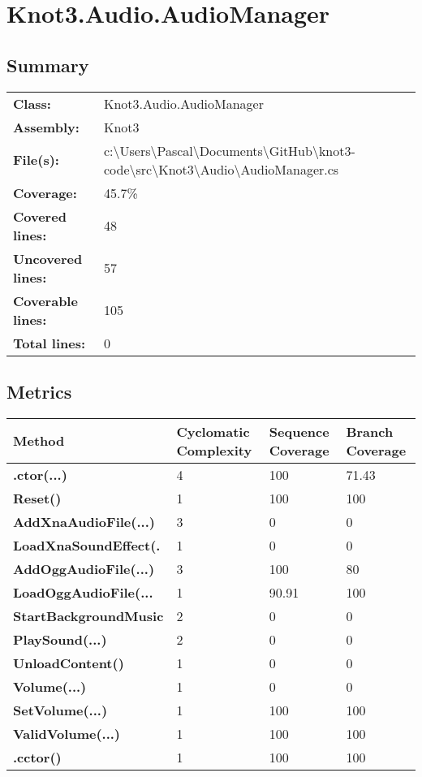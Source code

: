 \documentclass[a4paper,10pt]{article}
\begin{document}
\section{Knot3.Audio.AudioManager}
\subsection{Summary}
\begin{longtable}[l]{ll}
\textbf{Class:} & Knot3.Audio.AudioManager\\
\textbf{Assembly:} & Knot3\\
\textbf{File(s):} & \begin{minipage}[t]{12cm}{c:\textbackslash Users\textbackslash Pascal\textbackslash Documents\textbackslash GitHub\textbackslash knot3-code\textbackslash src\textbackslash Knot3\textbackslash Audio\textbackslash AudioManager.cs}\end{minipage} \\
\textbf{Coverage:} & 45.7\%\\
\textbf{Covered lines:} & 48\\
\textbf{Uncovered lines:} & 57\\
\textbf{Coverable lines:} & 105\\
\textbf{Total lines:} & 0\\
\end{longtable}
\subsection{Metrics}
\begin{longtable}[l]{|l|l|l|l|}
\hline
\textbf{Method} & \textbf{Cyclomatic Complexity} & \textbf{Sequence Coverage} & \textbf{Branch Coverage}\\
\hline
\textbf{.ctor(...)} & 4 & 100 & 71.43\\
\hline
\textbf{Reset()} & 1 & 100 & 100\\
\hline
\textbf{AddXnaAudioFile(...)} & 3 & 0 & 0\\
\hline
\textbf{LoadXnaSoundEffect(.} & 1 & 0 & 0\\
\hline
\textbf{AddOggAudioFile(...)} & 3 & 100 & 80\\
\hline
\textbf{LoadOggAudioFile(...} & 1 & 90.91 & 100\\
\hline
\textbf{StartBackgroundMusic} & 2 & 0 & 0\\
\hline
\textbf{PlaySound(...)} & 2 & 0 & 0\\
\hline
\textbf{UnloadContent()} & 1 & 0 & 0\\
\hline
\textbf{Volume(...)} & 1 & 0 & 0\\
\hline
\textbf{SetVolume(...)} & 1 & 100 & 100\\
\hline
\textbf{ValidVolume(...)} & 1 & 100 & 100\\
\hline
\textbf{.cctor()} & 1 & 100 & 100\\
\hline
\end{longtable}
\end{document}
